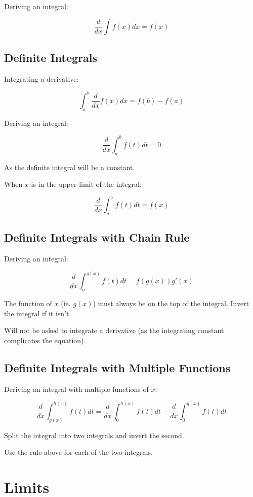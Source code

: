 \documentclass[a4paper,11pt]{article}
\begin{document}
Deriving an integral:

$$
\frac{d}{dx} \int f(x) dx = f(x)
$$


\subsection{Definite Integrals}

Integrating a derivative:

$$
\int_a^b \frac{d}{dx} f(x) dx = f(b) - f(a)
$$

Deriving an integral:

$$
\frac{d}{dx} \int_a^b f(t) dt = 0
$$

As the definite integral will be a constant.

When $x$ is in the upper limit of the integral:

$$
\frac{d}{dx} \int_a^x f(t) dt = f(x)
$$


\subsection{Definite Integrals with Chain Rule}

Deriving an integral:

$$
\frac{d}{dx} \int_a^{g(x)} f(t) dt = f(g(x)) g'(x)
$$

The function of $x$ (ie. $g(x)$) must always be on the top of the integral.
Invert the integral if it isn't.

Will not be asked to integrate a derivative (as the integrating constant
complicates the equation).


\subsection{Definite Integrals with Multiple Functions}

Deriving an integral with multiple functions of $x$:

$$
\frac{d}{dx} \int_{g(x)}^{h(x)} f(t) dt = \frac{d}{dx} \int_{0}^{h(x)} f(t) dt - \frac{d}{dx} \int_{0}^{g(x)} f(t) dt
$$

Split the integral into two integrals and invert the second.

Use the rule above for each of the two integrals.




\section{Limits}
\end{document}
